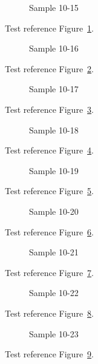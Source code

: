 \begin{figure}[tbhp]
\caption{Sample 10-15}
\label{fig:sample-10-15}
\end{figure}

Test reference Figure~\ref{fig:sample-10-15}.

\begin{figure}[tbhp]
\caption{Sample 10-16}
\label{fig:sample-10-16}
\end{figure}

Test reference Figure~\ref{fig:sample-10-16}.

\begin{figure}[tbhp]
\caption{Sample 10-17}
\label{fig:sample-10-17}
\end{figure}

Test reference Figure~\ref{fig:sample-10-17}.

\begin{figure}[tbhp]
\caption{Sample 10-18}
\label{fig:sample-10-18}
\end{figure}

Test reference Figure~\ref{fig:sample-10-18}.

\begin{figure}[tbhp]
\caption{Sample 10-19}
\label{fig:sample-10-19}
\end{figure}

Test reference Figure~\ref{fig:sample-10-19}.

\begin{figure}[tbhp]
\caption{Sample 10-20}
\label{fig:sample-10-20}
\end{figure}

Test reference Figure~\ref{fig:sample-10-20}.

\begin{figure}[tbhp]
\caption{Sample 10-21}
\label{fig:sample-10-21}
\end{figure}

Test reference Figure~\ref{fig:sample-10-21}.

\begin{figure}[tbhp]
\caption{Sample 10-22}
\label{fig:sample-10-22}
\end{figure}

Test reference Figure~\ref{fig:sample-10-22}.

\begin{figure}[tbhp]
\caption{Sample 10-23}
\label{fig:sample-10-23}
\end{figure}

Test reference Figure~\ref{fig:sample-10-23}.

